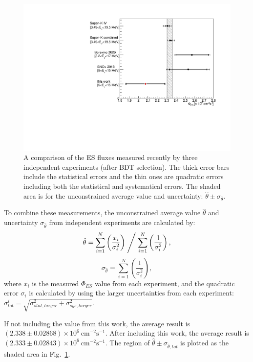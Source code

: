 \begin{figure}[!htb]
	\centering
	\includegraphics[width=12cm]{ESfluxCompare.pdf}
	\caption[A comparison of the ES flux measured recently by three independent experiments (after BDT selection).]{A comparison of the ES fluxes measured recently by three independent experiments (after BDT selection). The thick error bars include the statistical errors and the thin ones are quadratic errors including both the statistical and systematical errors. The shaded area is for the unconstrained average value and uncertainty: $\hat \theta \pm \sigma_{\hat \theta}$.}
	\label{fig:ESfluxCompareBDT}
\end{figure}

To combine these measurements, the unconstrained average value $\hat \theta$ and uncertainty $\sigma_{\hat\theta}$ from independent experiments are calculated by\cite{pdg2020,behnke2013data}:
\begin{equation}
\hat \theta = \sum_{i=1}^{N} \left(\frac{x_i}{\sigma_i^2}\right)\Biggm/\sum_{i=1}^{N}\left(\frac{1}{\sigma_i^2}\right),
\end{equation}
\begin{equation}
\sigma_{\hat\theta} = \sum_{i=1}^{N}\left(\frac{1}{\sigma_i^2}\right),
\end{equation}
where $x_i$ is the measured $\Phi_{ES}$ value from each experiment, and the quadratic error $\sigma_i$ is calculated by using the larger uncertainties from each experiment: $\sigma^i_{tot}=\sqrt{\sigma^2_{stat,larger}+\sigma^2_{sys,larger}}$.

If not including the value from this work, the average result is $(2.338 \pm 0.02868)\times  10^6~\mathrm{cm^{-2}s^{-1}}$. After including this work, the average result is  
$(2.333\pm0.02843)\times 10^6~\mathrm{cm^{-2}s^{-1}}$. The region of $\hat \theta\pm\sigma_{\hat\theta,tot}$ is plotted as the shaded area in Fig.~\ref{fig:ESfluxCompareBDT}.

